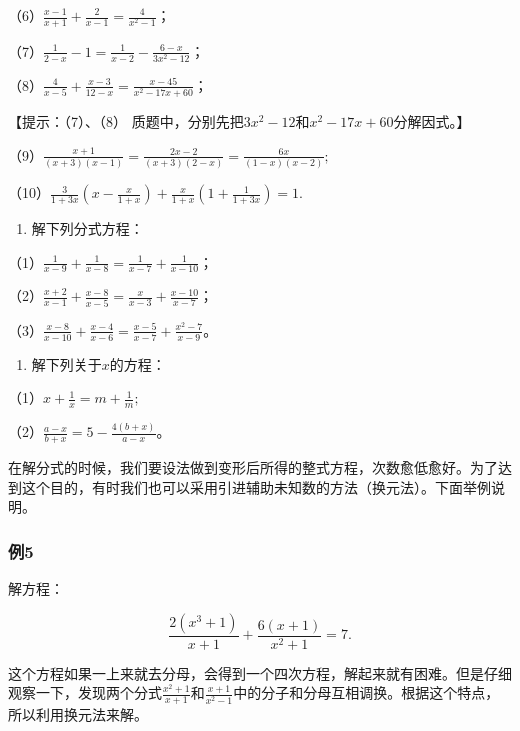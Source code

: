 （6）\(\frac{x - 1}{x + 1} + \frac{2}{x - 1} = \frac{4}{x^2 - 1}\)；

（7）\(\frac{1}{2 - x} - 1 = \frac{1}{x - 2} - \frac{6 - x}{3x^2 - 12}\)；

（8）\(\frac{4}{x - 5} + \frac{x - 3}{12 - x} = \frac{x - 45}{x^2 - 17x + 60}\)；

【提示：（7）、（8）
质题中，分别先把\(3x^{2} - 12\)和\(x^{2} - 17x + 60\)分解因式。】

（9）\(\frac{x + 1}{(x + 3)(x - 1)} = \frac{2x - 2}{(x + 3)(2 - x)} = \frac{6x}{(1 - x)(x - 2)};\)

（10）\(\frac{3}{1 + 3x}\left(x - \frac{x}{1 + x}\right) + \frac{x}{1 + x}\left(1 + \frac{1}{1 + 3x}\right) = 1.\)

\begin{enumerate}[start=2]
\item
  解下列分式方程：
\end{enumerate}

（1）\(\frac{1}{x - 9} + \frac{1}{x - 8} = \frac{1}{x - 7} + \frac{1}{x - 10}\)；

（2）\(\frac{x + 2}{x - 1} + \frac{x - 8}{x - 5} = \frac{x}{x - 3} + \frac{x - 10}{x - 7}\)；

（3）\(\frac{x - 8}{x - 10} + \frac{x - 4}{x - 6} = \frac{x - 5}{x - 7} + \frac{x^2 - 7}{x - 9}\)。

\begin{enumerate}[start=3]
\item
  解下列关于\(x\)的方程：
\end{enumerate}

（1）\(x + \frac{1}{x} = m + \frac{1}{m};\)

（2）\(\frac{a - x}{b + x} = 5 - \frac{4(b + x)}{a - x}\)。

在解分式的时候，我们要设法做到变形后所得的整式方程，次数愈低愈好。为了达到这个目的，有时我们也可以采用引进辅助未知数的方法（换元法）。下面举例说明。

\subsubsection{例5}

解方程：

\[
\frac{2 (x ^ {3} + 1)}{x + 1} + \frac{6 (x + 1)}{x ^ {2} + 1} = 7.
\]

这个方程如果一上来就去分母，会得到一个四次方程，解起来就有困难。但是仔细观察一下，发现两个分式\(\frac{x^2 + 1}{x + 1}\)和\(\frac{x + 1}{x^2 - 1}\)中的分子和分母互相调换。根据这个特点，所以利用换元法来解。

